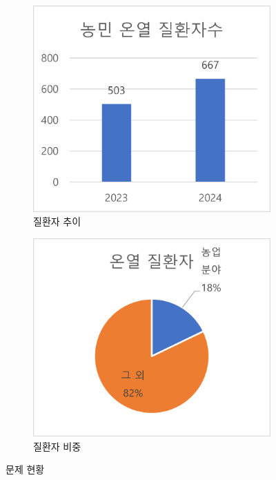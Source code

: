 \documentclass[12pt]{article}
\begin{document}
            \begin{figure}[h]
                \centering
                \begin{minipage}{.8\textwidth}
                    \centering
                    \begin{subfigure}{.4\textwidth}
                        \centering
                        \includegraphics[width=\linewidth]{chart1.png}
                        \caption{질환자 추이}
                        \label{bar}
                    \end{subfigure}
                    \hfill
                    \begin{subfigure}{.4\textwidth}
                        \centering
                        \includegraphics[width=\linewidth]{chart2.png}
                        \caption{질환자 비중}
                        \label{pie}
                    \end{subfigure}
                    \caption{문제 현황}
                    \label{ch}
                \end{minipage}
            \end{figure}
\end{document}
